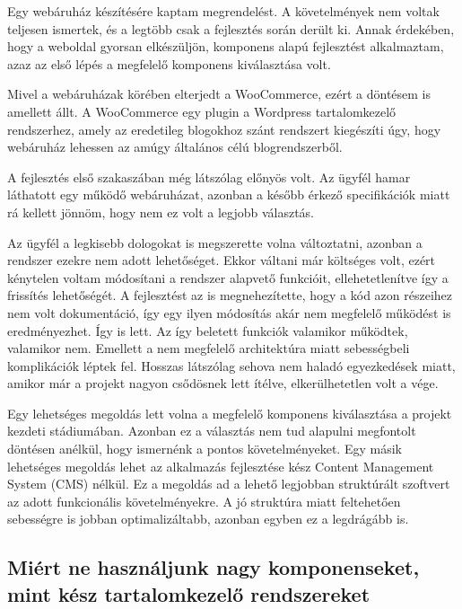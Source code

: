 \documentclass[a4paper,12pt,oneside]{report}
\begin{document}
\begin{justify}
	Egy webáruház készítésére kaptam megrendelést. A követelmények nem voltak teljesen ismertek, és a legtöbb csak a fejlesztés során derült ki. Annak érdekében, hogy a weboldal gyorsan elkészüljön, komponens alapú fejlesztést alkalmaztam, azaz az első lépés a megfelelő komponens kiválasztása volt.

	Mivel a webáruházak körében elterjedt a WooCommerce, ezért a döntésem is amellett állt. A WooCommerce egy plugin a Wordpress tartalomkezelő rendszerhez, amely az eredetileg blogokhoz szánt rendszert kiegészíti úgy, hogy webáruház lehessen az amúgy általános célú blogrendszerből.

	A fejlesztés első szakaszában még látszólag előnyös volt. Az ügyfél hamar láthatott egy működő webáruházat, azonban a később érkező specifikációk miatt rá kellett jönnöm, hogy nem ez volt a legjobb választás. 

	Az ügyfél a legkisebb dologokat is megszerette volna változtatni, azonban a rendszer ezekre nem adott lehetőséget. Ekkor váltani már költséges volt, ezért kénytelen voltam módosítani a rendszer alapvető funkcióit, ellehetetlenítve így a frissítés lehetőségét. A fejlesztést az is megnehezítette, hogy a kód azon részeihez nem volt dokumentáció, így egy ilyen módosítás akár nem megfelelő működést is eredményezhet. Így is lett. Az így beletett funkciók valamikor működtek, valamikor nem. Emellett a nem megfelelő architektúra miatt sebességbeli komplikációk léptek fel. Hosszas látszólag sehova nem haladó egyezkedések miatt, amikor már a projekt nagyon csődösnek lett ítélve, elkerülhetetlen volt a vége. 

	Egy lehetséges megoldás lett volna a megfelelő komponens kiválasztása a projekt kezdeti stádiumában. Azonban ez a választás nem tud alapulni megfontolt döntésen anélkül, hogy ismernénk a pontos követelményeket. Egy másik lehetséges megoldás lehet az alkalmazás fejlesztése kész Content Management System (CMS) nélkül. Ez a megoldás ad a lehető legjobban struktúrált szoftvert az adott funkcionális követelményekre. A jó struktúra miatt feltehetően sebességre is jobban optimalizáltabb, azonban egyben ez a legdrágább is.
\end{justify}

\newpage
\subsection{Miért ne használjunk nagy komponenseket, mint kész tartalomkezelő rendszereket}
\end{document}
